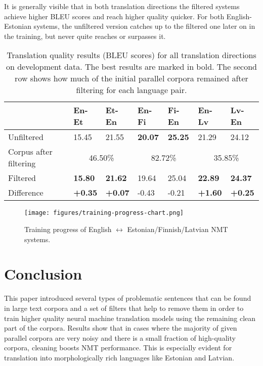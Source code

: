 \documentclass{IOS-Book-Article}
\begin{document}
It is generally visible that in both translation directions the filtered systems achieve higher BLEU scores and reach higher quality quicker. For both English-Estonian systems, the unfiltered version catches up to the filtered one later on in the training, but never quite reaches or surpasses it. 

\begin{table}[h]
    \caption{Translation quality results (BLEU scores) for all translation directions on development data. The best results are marked in bold. The second row shows how much of the initial parallel corpora remained after filtering for each language pair.}
    \begin{tabular}{lllllll}
    \hline
     & En-Et & Et-En & En-Fi & Fi-En & En-Lv & Lv-En \\ \hline
    Unfiltered & 15.45 & 21.55 & \textbf{20.07} & \textbf{25.25} & 21.29 & 24.12 \\
    Corpus after filtering & \multicolumn{2}{c}{46.50\%} & \multicolumn{2}{c}{82.72\%} & \multicolumn{2}{c}{35.85\%} \\
    Filtered & \textbf{15.80} & \textbf{21.62} & 19.64 & 25.04 & \textbf{22.89} & \textbf{24.37} \\
    Difference & \textbf{+0.35} & \textbf{+0.07} & -0.43 & -0.21 & \textbf{+1.60} & \textbf{+0.25} \\ \hline
    \end{tabular}
    \label{tab:mt-results}
\end{table}

\begin{figure}[h]
  \texttt{[image: figures/training-progress-chart.png]}
  \caption{Training progress of English $\leftrightarrow$ Estonian/Finnish/Latvian NMT systems.}
  \label{fig:NMTProgress}
\end{figure}

\section{Conclusion} 
\label{sec:conclusion}

This paper introduced several types of problematic sentences that can be found in large text corpora and a set of filters that help to remove them in order to train higher quality neural machine translation models using the remaining clean part of the corpora. Results show that in cases where the majority of given parallel corpora are very noisy and there is a small fraction of high-quality corpora, cleaning boosts NMT performance. This is especially evident for translation into morphologically rich languages like Estonian and Latvian.
\end{document}
